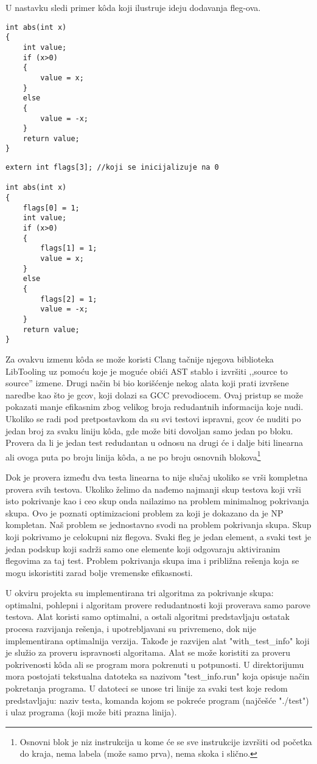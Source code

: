 \documentclass[a4paper]{article}
\begin{document}
U nastavku sledi primer kôda koji ilustruje ideju dodavanja fleg-ova.

\newpage

\begin{lstlisting}
int abs(int x)
{
	int value;
	if (x>0)
	{
		value = x;
	}
	else
	{
		value = -x;
	}
	return value;
}
\end{lstlisting}

\begin{lstlisting}
extern int flags[3]; //koji se inicijalizuje na 0

int abs(int x)
{
	flags[0] = 1;
	int value;
	if (x>0)
	{
		flags[1] = 1;
		value = x;
	}
	else
	{
		flags[2] = 1;
		value = -x;
	}
	return value;
}
\end{lstlisting}

Za ovakvu izmenu kôda se može koristi Clang tačnije njegova biblioteka LibTooling uz pomoću koje je moguće obići AST stablo i izvršiti ,,source to source'' izmene. Drugi način bi bio korišćenje nekog alata koji prati izvršene naredbe kao što je gcov, koji dolazi sa GCC prevodiocem. Ovaj pristup se može pokazati manje efikasnim zbog velikog broja redudantnih informacija koje nudi. Ukoliko se radi pod pretpostavkom da su svi testovi ispravni, gcov će nuditi po jedan broj za svaku liniju kôda, gde može biti dovoljan samo jedan po bloku. Provera da li je jedan test redudantan u odnosu na drugi će i dalje biti linearna ali ovoga puta po broju linija kôda, a ne po broju osnovnih blokova\footnote{Osnovni blok je niz instrukcija u kome će se sve instrukcije izvršiti od početka do kraja, nema labela (može samo prva), nema skoka i slično.} 

Dok je provera između dva testa linearna to nije slučaj ukoliko se vrši kompletna provera svih testova. Ukoliko želimo da nađemo najmanji skup testova koji vrši isto pokrivanje kao i ceo skup onda nailazimo na problem minimalnog pokrivanja skupa. Ovo je poznati optimizacioni problem za koji je dokazano da je NP kompletan. Naš problem se jednostavno svodi na problem pokrivanja skupa. Skup koji pokrivamo je celokupni niz flegova. Svaki fleg je jedan element, a svaki test je jedan podskup koji sadrži samo one elemente koji odgovaraju aktiviranim flegovima za taj test. Problem pokrivanja skupa ima i približna rešenja koja se mogu iskoristiti zarad bolje vremenske efikasnosti. 

U okviru projekta su implementirana tri algoritma za pokrivanje skupa: optimalni, pohlepni i algoritam provere redudantnosti koji proverava samo parove testova. Alat koristi samo optimalni, a ostali algoritmi predstavljaju ostatak procesa razvijanja rešenja, i upotrebljavani su privremeno, dok nije implementirana optimalnija verzija. Takođe je razvijen alat "with\_test\_info" \space koji je služio za proveru ispravnosti algoritama. Alat se može koristiti za proveru pokrivenosti kôda ali se program mora pokrenuti u potpunosti. U direktorijumu mora postojati tekstualna datoteka sa nazivom "test\_info.run" \space koja opisuje način pokretanja programa. U datoteci se unose tri linije za svaki test koje redom predstavljaju: naziv testa, komanda kojom se pokreće program (najčešće "./test") i ulaz programa (koji može biti prazna linija).
\end{document}
